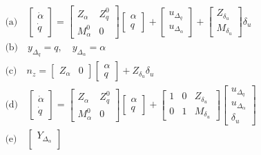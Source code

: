 \documentclass{article}
\begin{document}
\begin{align*}
&\text{(a)} \quad
\begin{bmatrix}
\dot{\alpha} \\
\dot{q}
\end{bmatrix}
=
\begin{bmatrix}
Z_\alpha & Z^0_q \\
M^0_\alpha & 0
\end{bmatrix}
\begin{bmatrix}
\alpha \\
q
\end{bmatrix}
+
\begin{bmatrix}
u_{\Delta_q} \\
u_{\Delta_\alpha}
\end{bmatrix}
+
\begin{bmatrix}
Z_{\delta_u} \\
M_{\delta_u} 
\end{bmatrix}
\delta_u \\
&\text{(b)} \quad
y_{\Delta_q} = q, \quad y_{\Delta_\alpha} = \alpha \\
&\text{(c)} \quad
n_z =
\begin{bmatrix}
Z_\alpha & 0
\end{bmatrix}
\begin{bmatrix}
\alpha \\
q
\end{bmatrix}
+ Z_{\delta_u} \delta_u \\
&\text{(d)} \quad
\begin{bmatrix}
\dot{\alpha} \\
\dot{q}
\end{bmatrix}
=
\begin{bmatrix}
Z_\alpha & Z_q^0 \\
M^0_\alpha & 0
\end{bmatrix}
\begin{bmatrix}
\alpha \\
q
\end{bmatrix}
+
\begin{bmatrix}
1 & 0 & Z_{\delta_u} \\
0 & 1 & M_{\delta_u}
\end{bmatrix}
\begin{bmatrix}
u_{\Delta_q} \\
u_{\Delta_\alpha} \\
\delta_u
\end{bmatrix} \\
&\text{(e)} \quad
\begin{bmatrix}
Y_{\Delta_\alpha} \\

\end{bmatrix}
\end{align*}
\end{document}
